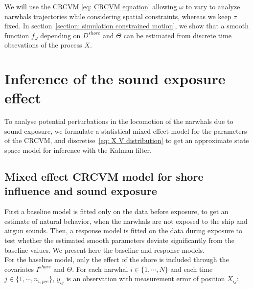 \documentclass[aoas]{imsart}
\theoremstyle{definition}
\theoremstyle{remark}
\theoremstyle{remark}
\newcommand {\1}{\mathbb{1}}
\begin{document}
We will use the CRCVM \eqref{eq: CRCVM equation} allowing $\omega$ to vary to analyze narwhals trajectories while considering spatial constraints, whereas we keep $\tau$ fixed. In section~\ref{section: simulation constrained motion}, we show that a smooth function $f_{\omega}$ depending on $D^{shore}$ and $\Theta$ can be estimated from discrete time obsevations of the process $X$.




\section{Inference of the sound exposure effect}

To analyse potential perturbations in the locomotion of the narwhals due to sound exposure, we formulate a statistical mixed effect model for the parameters of the CRCVM, and discretise~\eqref{eq: X V distribution} to get an approximate state space model for inference with the Kalman filter.


\subsection{Mixed effect CRCVM model for  shore influence and sound exposure}
\label{subsection: ship exposure effect}


First a baseline model is fitted only on the data before exposure, to get an estimate of natural behavior, when the narwhals are not exposed to the ship and airgun sounds. Then, a response model is fitted on the data during exposure to test whether the estimated smooth parameters deviate significantly from the baseline values. We present here the baseline and response models.\\

For the baseline model, only the effect of the shore is included through the covariates $I^{shore}$ and $\Theta$. For each narwhal $i \in \{1, \cdots, N\}$ and each time $j\in\{1, \cdots, n_{i,pre}\}$, $y_{ij}$ is an observation with measurement error of position $X_{ij}$:
\end{document}
